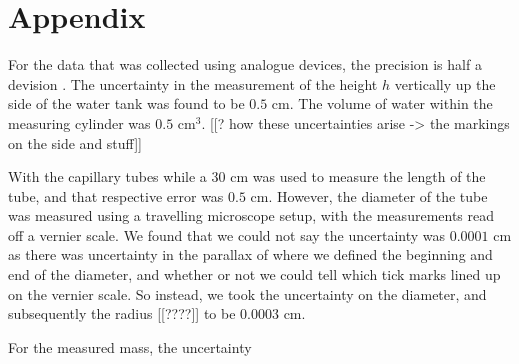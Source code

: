 \documentclass[twocolumn]{revtex4}
\begin{document}
\section*{Appendix}
\vspace{-2ex}

For the data that was collected using analogue devices, the precision is half a devision \cite{crc}. The uncertainty in the measurement of the height $h$ vertically up the side of the water tank was found to be $0.5$ cm. The volume of water within the measuring cylinder was $0.5$ cm$^{3}$. [[? how these uncertainties arise -> the markings on the side and stuff]] 

With the capillary tubes while a $30$ cm was used to measure the length of the tube, and that respective error was $0.5$ cm. However, the diameter of the tube was measured using a travelling microscope setup, with the measurements read off a vernier scale. We found that we could not say the uncertainty was $0.0001$ cm as there was uncertainty in the parallax of where we defined the beginning and end of the diameter, and whether or not we could tell which tick marks lined up on the vernier scale. So instead, we took the uncertainty on the diameter, and subsequently the radius [[????]] to be $0.0003$ cm. 

For the measured mass, the uncertainty 

\clearpage
\end{document}
